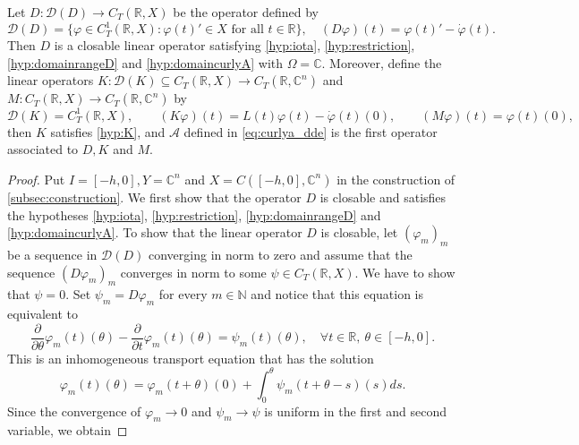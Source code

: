\documentclass[english]{myarticle}
\begin{document}
\begin{sloppypar}
\begin{lemma} \label{lemma:operatorlemmaDDE}
Let $D : \mathcal{D}(D) \to C_T(\mathbb{R},X)$ be the operator defined by
\begin{equation} \label{eq:domainDDDE}
    \mathcal{D}(D) = \{ \varphi \in C_T^1(\mathbb{R},X) : \varphi(t)' \in X \mbox{ for all $t \in \mathbb{R}$} \}, \quad (D\varphi)(t) = \varphi(t)' - \dot{\varphi}(t).
\end{equation}
Then $D$ is a closable linear operator satisfying \ref{hyp:iota}, \ref{hyp:restriction}, \ref{hyp:domainrangeD} and \ref{hyp:domaincurlyA} with $\Omega = \mathbb{C}$. Moreover, define the linear operators $K : \mathcal{D}(K) \subseteq C_T(\mathbb{R},X) \to C_T(\mathbb{R},\mathbb{C}^n)$ and $M : C_T(\mathbb{R},X) \to C_T(\mathbb{R},\mathbb{C}^n)$ by
\begin{equation} \label{eq:KMdde}
     \mathcal{D}(K) = C_T^1(\mathbb{R},X), \qquad (K\varphi)(t) = L(t) \varphi(t) - \dot{\varphi}(t)(0), \qquad (M\varphi)(t) = \varphi(t)(0), 
\end{equation}
then $K$ satisfies \ref{hyp:K}, and $\mathcal{A}$ defined in \eqref{eq:curlya_dde} is the first operator associated to $D, K$ and $M$.  
\end{lemma}
\begin{proof}
Put $I = [-h,0], Y = \mathbb{C}^n$ and $X =  C([-h,0],\mathbb{C}^n)$ in the construction of \cref{subsec:construction}. We first show that the operator $D$ is closable and satisfies the hypotheses \ref{hyp:iota}, \ref{hyp:restriction}, \ref{hyp:domainrangeD} and \ref{hyp:domaincurlyA}. To show that the linear operator $D$ is closable, let $(\varphi_m)_m$ be a sequence in $\mathcal{D}(D)$ converging in norm to zero and assume that the sequence $(D\varphi_m)_m$ converges in norm to some $\psi \in C_T(\mathbb{R},X)$. We have to show that $\psi = 0$. Set $\psi_m = D\varphi_m$ for every $m \in \mathbb{N}$ and notice that this equation is equivalent to
\begin{equation*}
    \frac{\partial}{\partial \theta} \varphi_m(t)(\theta) - \frac{\partial}{\partial t} \varphi_m(t)(\theta) = \psi_m(t)(\theta),  \quad \forall t \in \mathbb{R}, \ \theta \in [-h,0].
\end{equation*}
This is an inhomogeneous transport equation that has the solution
\begin{equation*}
    \varphi_m(t)(\theta) = \varphi_m(t+\theta)(0) + \int_0^\theta \psi_m(t+\theta-s)(s) ds.
\end{equation*}
Since the convergence of $\varphi_m \to 0$ and $\psi_m \to \psi$ is uniform in the first and second variable, we obtain

\end{proof}
\end{sloppypar}
\end{document}
